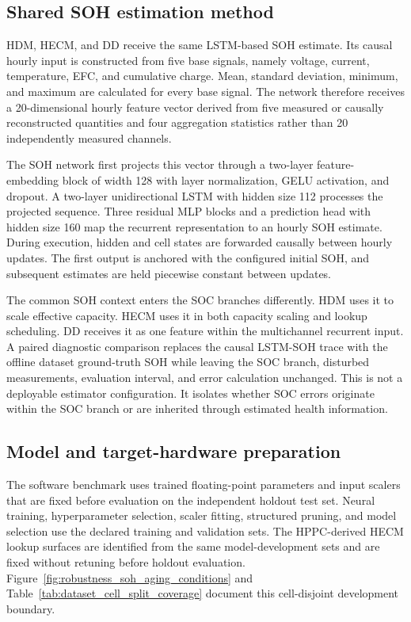 \subsection{Shared SOH estimation method}

HDM, HECM, and DD receive the same LSTM-based SOH estimate. Its causal hourly input is constructed from five base signals, namely voltage, current, temperature, EFC, and cumulative charge. Mean, standard deviation, minimum, and maximum are calculated for every base signal. The network therefore receives a 20-dimensional hourly feature vector derived from five measured or causally reconstructed quantities and four aggregation statistics rather than 20 independently measured channels.\autocite{Embedded_AI_SOH_badData,gouEnsembleLearningBasedDataDriven2021,liOnlineCapacityEstimation2021,rzepkaNeuralNetworkArchitecture2023a}

The SOH network first projects this vector through a two-layer feature-embedding block of width 128 with layer normalization, GELU activation, and dropout. A two-layer unidirectional LSTM with hidden size 112 processes the projected sequence. Three residual MLP blocks and a prediction head with hidden size 160 map the recurrent representation to an hourly SOH estimate. During execution, hidden and cell states are forwarded causally between hourly updates. The first output is anchored with the configured initial SOH, and subsequent estimates are held piecewise constant between updates.

The common SOH context enters the SOC branches differently. HDM uses it to scale effective capacity. HECM uses it in both capacity scaling and lookup scheduling. DD receives it as one feature within the multichannel recurrent input. A paired diagnostic comparison replaces the causal LSTM-SOH trace with the offline dataset ground-truth SOH while leaving the SOC branch, disturbed measurements, evaluation interval, and error calculation unchanged. This is not a deployable estimator configuration. It isolates whether SOC errors originate within the SOC branch or are inherited through estimated health information.

\subsection{Model and target-hardware preparation}
\label{sec:robustness_embedded_preparation}

The software benchmark uses trained floating-point parameters and input scalers that are fixed before evaluation on the independent holdout test set. Neural training, hyperparameter selection, scaler fitting, structured pruning, and model selection use the declared training and validation sets. The HPPC-derived HECM lookup surfaces are identified from the same model-development sets and are fixed without retuning before holdout evaluation. Figure~\ref{fig:robustness_soh_aging_conditions} and Table~\ref{tab:dataset_cell_split_coverage} document this cell-disjoint development boundary.

